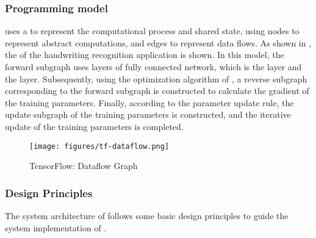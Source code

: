 \begin{content}
\subsubsection{Programming model}
 uses a  to represent the computational process and shared state, using nodes to represent abstract computations, and edges to represent data flows. As shown in , the  of the  handwriting recognition application is shown. In this model, the forward subgraph uses  layers of fully connected network, which is the  layer and the  layer. Subsequently, using the optimization algorithm of , a reverse subgraph corresponding to the forward subgraph is constructed to calculate the gradient of the training parameters. Finally, according to the parameter update rule, the update subgraph of the training parameters is constructed, and the iterative update of the training parameters is completed.
\begin{figure}[H]
  \centering
  \texttt{[image: figures/tf-dataflow.png]}
  \caption{TensorFlow: Dataflow Graph}
  \label{fig:tf-dataflow}
\end{figure}


\subsubsection{Design Principles}
The system architecture of \tf{} follows some basic design principles to guide the system implementation of \tf{}.
\begin{enum}
\end{enum}



\end{content}
